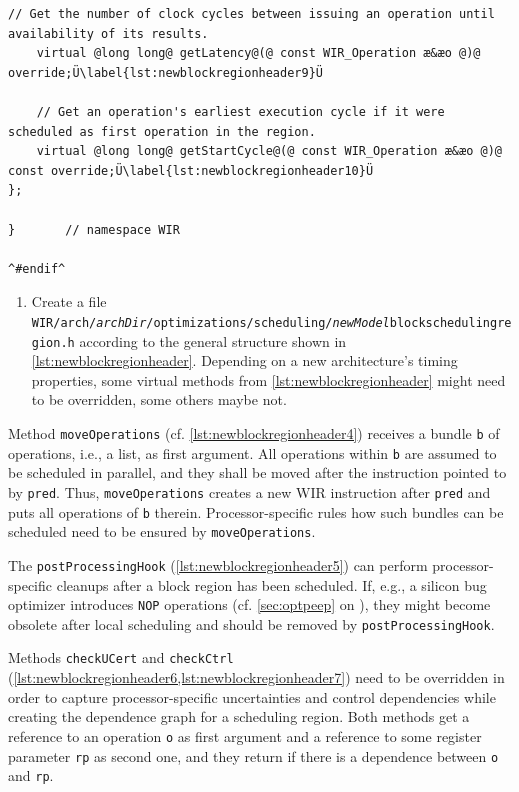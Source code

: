 \begin{lstlisting}[style=code,float=!ht,caption={Header File for a New Processor Model's Block Scheduling Region},label=lst:newblockregionheader]
    // Get the number of clock cycles between issuing an operation until availability of its results.
    virtual @long long@ getLatency@(@ const WIR_Operation æ&æo @)@ override;Ü\label{lst:newblockregionheader9}Ü

    // Get an operation's earliest execution cycle if it were scheduled as first operation in the region.
    virtual @long long@ getStartCycle@(@ const WIR_Operation æ&æo @)@ const override;Ü\label{lst:newblockregionheader10}Ü
};

}       // namespace WIR

^#endif^
\end{lstlisting}

\begin{enumerate}[resume]
  \item Create a file \texttt{WIR/arch/{\itshape archDir}/optimizations/scheduling/{\itshape newModel}blockschedulingregion.h} according to the general structure shown in \cref{lst:newblockregionheader}.
  Depending on a new architecture's timing properties, some virtual methods from \cref{lst:newblockregionheader} might need to be overridden, some others maybe not.
\end{enumerate}

Method \texttt{moveOperations} (cf. \cref{lst:newblockregionheader4}) receives a bundle \texttt{b} of operations, i.e., a list, as first argument.
All operations within \texttt{b} are assumed to be scheduled in parallel, and they shall be moved after the instruction pointed to by \texttt{pred}.
Thus, \texttt{moveOperations} creates a new \gls{WIR} instruction after \texttt{pred} and puts all operations of \texttt{b} therein.
Processor-specific rules how such bundles can be scheduled need to be ensured by \texttt{moveOperations}.

The \texttt{postProcessingHook} (\cref{lst:newblockregionheader5}) can perform processor-specific cleanups after a block region has been scheduled.
If, e.g., a silicon bug optimizer introduces \texttt{NOP} operations (cf. \cref{sec:optpeep} on ), they might become obsolete after local scheduling and should be removed by \texttt{postProcessingHook}.

Methods \texttt{checkUCert} and \texttt{checkCtrl} (\cref{lst:newblockregionheader6,lst:newblockregionheader7}) need to be overridden in order to capture processor-specific uncertainties and control dependencies while creating the dependence graph for a scheduling region.
Both methods get a reference to an operation \texttt{o} as first argument and a reference to some register parameter \texttt{rp} as second one, and they return  if there is a dependence between \texttt{o} and \texttt{rp}.

